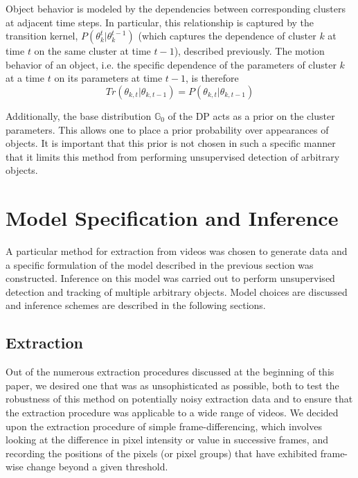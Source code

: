 \documentclass{article}
\begin{document}
Object behavior is modeled by the dependencies between corresponding clusters at adjacent time steps. In particular, this relationship is captured by the transition kernel, $P(\theta_{k}^{t} | \theta_{k}^{t-1})$ (which captures the dependence of cluster $k$ at time $t$ on the same cluster at time $t-1$), described previously. The motion behavior of an object, i.e. the specific dependence of the parameters of cluster $k$ at a time $t$ on its parameters at time $t-1$, is therefore
\begin{equation}
Tr(\theta_{k, t} | \theta_{k, t-1}) = P(\theta_{k, t} | \theta_{k, t-1})
\end{equation}

Additionally, the base distribution $\mathbb{G}_{0}$ of the DP acts as a prior on the cluster parameters. This allows one to place a prior probability over appearances of objects. It is important that this prior is not chosen in such a specific manner that it limits this method from performing unsupervised detection of arbitrary objects.









\section{Model Specification and Inference}

A particular method for extraction from videos was chosen to generate data and a specific formulation of the model described in the previous section was constructed. Inference on this model was carried out to perform unsupervised detection and tracking of multiple arbitrary objects. Model choices are discussed and inference schemes are described in the following sections.



\subsection{Extraction}

Out of the numerous extraction procedures discussed at the beginning of this paper, we desired one that was as unsophisticated as possible, both to test the robustness of this method on potentially noisy extraction data and to ensure that the extraction procedure was applicable to a wide range of videos. We decided upon the extraction procedure of simple frame-differencing, which involves looking at the difference in pixel intensity or value in successive frames, and recording the positions of the pixels (or pixel groups) that have exhibited frame-wise change beyond a given threshold.
\end{document}
